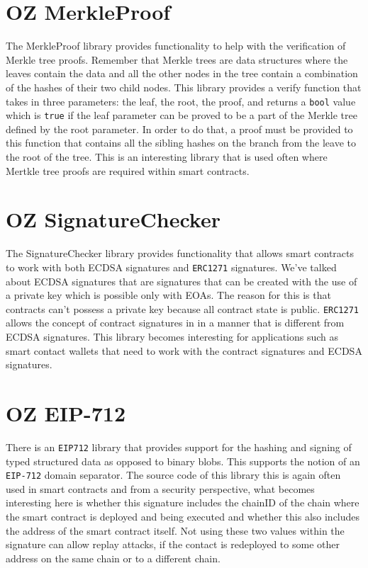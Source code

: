 \section{OZ MerkleProof}
The MerkleProof library provides functionality to help with the verification of Merkle tree proofs. Remember that Merkle trees are data structures where the leaves contain the data and all the other nodes in the tree contain a combination of the hashes of their two child nodes. This library provides a verify function that takes in three parameters: the leaf, the root, the proof, and returns a \verb|bool| value which is \verb|true| if the leaf parameter can be proved to be a part of the Merkle tree defined by the root parameter. In order to do that, a proof must be provided to this function that contains all the sibling hashes on the branch from the leave to the root of the tree. This is an interesting library that is used often where Mertkle tree proofs are required within smart contracts.

\section{OZ SignatureChecker}
The SignatureChecker library provides functionality that allows smart contracts to work with both ECDSA signatures and \verb|ERC1271| signatures. We've talked about ECDSA signatures that are signatures that can be created with the use of a private key which is possible only with EOAs. The reason for this is that contracts can't possess a private key because all contract state is public. \verb|ERC1271| allows the concept of contract signatures in in a manner that is different from ECDSA signatures. This library becomes interesting for applications such as smart contact wallets that need to work with the contract signatures and ECDSA signatures.

\section{OZ EIP-712}
There is an \verb|EIP712| library that provides support for the hashing and signing of typed structured data as opposed to binary blobs. This supports the notion of an \verb|EIP-712| domain separator. The source code of this library this is again often used in smart contracts and from a security perspective, what becomes interesting here is whether this signature includes the chainID of the chain where the smart contract is deployed and being executed and whether this also includes the address of the smart contract itself. Not using these two values within the signature can allow replay attacks, if the contact is redeployed to some other address on the same chain or to a different chain.

